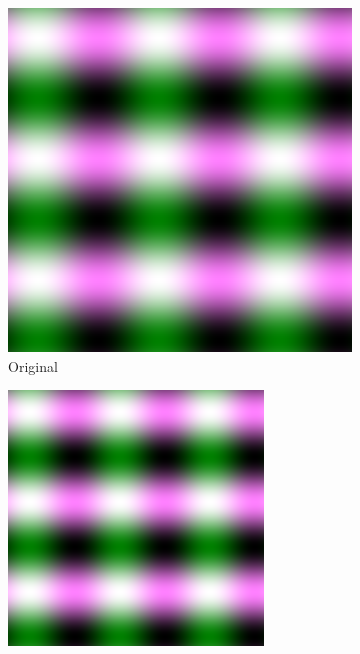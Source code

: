 \documentclass{article}
\begin{document}
\begin{figure}[ht]
  \centering
  \begin{subfigure}{0.23\textwidth}
    \centering
    \includegraphics[width=\textwidth]{senoidal/senoidal.png}
    \caption{Original}
  \end{subfigure}%
  \hfill
  \begin{subfigure}{0.23\textwidth}
    \centering
    \includegraphics[width=\textwidth]{senoidal/h-1/compressed.png}

\end{subfigure}
\end{figure}
\end{document}
